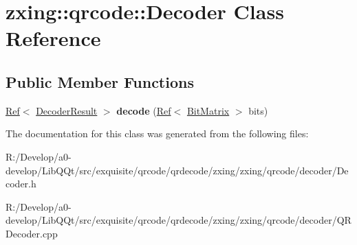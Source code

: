 \hypertarget{classzxing_1_1qrcode_1_1_decoder}{}\section{zxing\+:\+:qrcode\+:\+:Decoder Class Reference}
\label{classzxing_1_1qrcode_1_1_decoder}
\subsection*{Public Member Functions}
\begin{DoxyCompactItemize}
\item 
\mbox{\label{classzxing_1_1qrcode_1_1_decoder_a4a2f137751504ac644f5e85b6d44da00}} 
\mbox{\hyperlink{classzxing_1_1_ref}{Ref}}$<$ \mbox{\hyperlink{classzxing_1_1_decoder_result}{Decoder\+Result}} $>$ {\bfseries decode} (\mbox{\hyperlink{classzxing_1_1_ref}{Ref}}$<$ \mbox{\hyperlink{classzxing_1_1_bit_matrix}{Bit\+Matrix}} $>$ bits)
\end{DoxyCompactItemize}


The documentation for this class was generated from the following files\+:\begin{DoxyCompactItemize}
\item 
R\+:/\+Develop/a0-\/develop/\+Lib\+Q\+Qt/src/exquisite/qrcode/qrdecode/zxing/zxing/qrcode/decoder/Decoder.\+h\item 
R\+:/\+Develop/a0-\/develop/\+Lib\+Q\+Qt/src/exquisite/qrcode/qrdecode/zxing/zxing/qrcode/decoder/Q\+R\+Decoder.\+cpp\end{DoxyCompactItemize}
